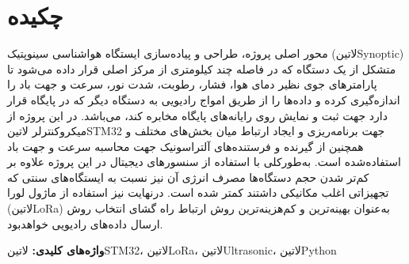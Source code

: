 \clearpage
\pagestyle{empty}
\vspace*{\fill}

\section*{چکیده}

محور اصلی پروژه، طراحی و پیاده‌سازی ایستگاه هواشناسی سینوپتیک (‌لاتین{Synoptic}) متشکل از یک دستگاه که در فاصله چند کیلومتری از مرکز اصلی قرار داده می‌شود تا پارامترهای جوی نظیر دمای هوا، فشار، رطوبت، شدت نور، سرعت و جهت باد را اندازه‌گیری کرده و داده‌ها را از طریق امواج رادیویی به دستگاه دیگر که در پایگاه قرار دارد جهت ثبت و نمایش روی رایانه‌های پایگاه مخابره کند، می‌باشد. در این پروژه از میکروکنترلر ‌لاتین{STM32} جهت برنامه‌ریزی و ایجاد ارتباط میان بخش‌های مختلف و همچنین از گیرنده و فرستنده‌های آلتراسونیک جهت محاسبه سرعت و جهت باد استفاده‌شده است. به‌طورکلی با استفاده از سنسورهای دیجیتال در این پروژه علاوه بر کم‌تر شدن حجم دستگاه‌ها مصرف انرژی آن نیز نسبت به ایستگاه‌های سنتی که تجهیزاتی اغلب مکانیکی داشتند کمتر شده است. درنهایت نیز استفاده از ماژول لورا (‌لاتین{LoRa}) به‌عنوان بهینه‌ترین و کم‌هزینه‌ترین روش ارتباط راه گشای انتخاب روش ارسال داده‌های رادیویی خواهدبود. 

\noindent
{\bf
واژه‌های كليدی:
} 
‌لاتین{STM32}، ‌لاتین{LoRa}، ‌لاتین{Ultrasonic}، ‌لاتین{Python}

\vspace*{\fill}
\clearpage